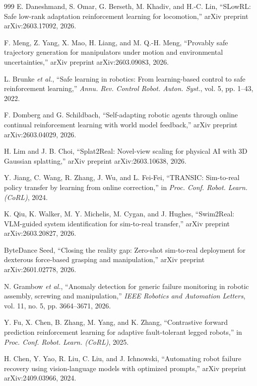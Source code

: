 \documentclass[12pt,a4paper,oneside]{report}
\begin{document}
\begin{thebibliography}{999}
E. Daneshmand, S. Omar, G. Berseth, M. Khadiv, and H.-C. Lin, ``{SLowRL}: Safe low-rank adaptation reinforcement learning for locomotion,'' arXiv preprint arXiv:2603.17092, 2026.

F. Meng, Z. Yang, X. Mao, H. Liang, and M. Q.-H. Meng, ``Provably safe trajectory generation for manipulators under motion and environmental uncertainties,'' arXiv preprint arXiv:2603.09083, 2026.

L. Brunke \textit{et al.}, ``Safe learning in robotics: From learning-based control to safe reinforcement learning,'' \textit{Annu. Rev. Control Robot. Auton. Syst.}, vol. 5, pp. 1--43, 2022.

F. Domberg and G. Schildbach, ``Self-adapting robotic agents through online continual reinforcement learning with world model feedback,'' arXiv preprint arXiv:2603.04029, 2026.

H. Lim and J. B. Choi, ``Splat2Real: Novel-view scaling for physical {AI} with {3D} Gaussian splatting,'' arXiv preprint arXiv:2603.10638, 2026.

Y. Jiang, C. Wang, R. Zhang, J. Wu, and L. Fei-Fei, ``{TRANSIC}: Sim-to-real policy transfer by learning from online correction,'' in \textit{Proc. Conf. Robot. Learn. (CoRL)}, 2024.

K. Qiu, K. Walker, M. Y. Michelis, M. Cygan, and J. Hughes, ``Swim2Real: VLM-guided system identification for sim-to-real transfer,'' arXiv preprint arXiv:2603.20827, 2026.

ByteDance Seed, ``Closing the reality gap: Zero-shot sim-to-real deployment for dexterous force-based grasping and manipulation,'' arXiv preprint arXiv:2601.02778, 2026.


N. Grambow \textit{et al.}, ``Anomaly detection for generic failure monitoring in robotic assembly, screwing and manipulation,'' \textit{IEEE Robotics and Automation Letters}, vol. 11, no. 5, pp. 3664--3671, 2026.

Y. Fu, X. Chen, B. Zhang, M. Yang, and K. Zhang, ``Contrastive forward prediction reinforcement learning for adaptive fault-tolerant legged robots,'' in \textit{Proc. Conf. Robot. Learn. (CoRL)}, 2025.

H. Chen, Y. Yao, R. Liu, C. Liu, and J. Ichnowski, ``Automating robot failure recovery using vision-language models with optimized prompts,'' arXiv preprint arXiv:2409.03966, 2024.


\end{thebibliography}
\end{document}

